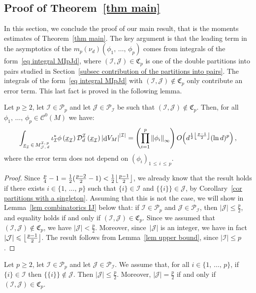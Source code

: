 \documentclass[AHL,Unicode,longabstracts,published]{cedram}
\DeclareMathOperator{\dmesure}{d}
\DeclarePairedDelimiter{\floor}{\lfloor}{\rfloor}
\newcommand{\D}{\mathcal{D}}
\newcommand{\I}{\mathcal{I}}
\newcommand{\J}{\mathcal{J}}
\newcommand{\clC}{\mathcal{C}}
\newcommand{\frkC}{\mathfrak{C}}
\newcommand{\pa}{\mathcal{P}\!}
\newcommand{\norm}[1]{\left\lvert #1 \right\rvert}
\newcommand{\Norm}[1]{\left\lVert #1 \right\rVert}
\newcommand{\rmes}[1]{\norm{\dmesure\! V_{#1}}}
\renewcommand{\geq}{\geqslant}
\renewcommand{\leq}{\leqslant}
\begin{document}

\subsection{Proof of Theorem~\ref{thm main}}\label{subsec proof of the main theorem}

In this section, we conclude the proof of our main result, that is the moments estimates of Theorem~\ref{thm main}. The key argument is that the leading term in the asymptotics of the $m_p(\nu_d)(\phi_1,\,\dots,\,\phi_p)$ comes from integrals of the form~\eqref{eq integral MIpJd}, where $(\I,\J) \in \frkC_p$ is one of the double partitions into pairs studied in Section~\ref{subsec contribution of the partitions into pairs}. The integrals of the form~\eqref{eq integral MIpJd} with $(\I,\J) \notin \frkC_p$ only contribute an error term. This last fact is proved in the following lemma.

\begin{lemm}\label{lem order of the error terms}
Let $p \geq 2$, let $\I \in \pa_p$ and let $\J \in \pa_\I$ be such that $(\I,\J) \notin \frkC_p$. Then, for all $\phi_1,\,\dots,\,\phi_p \in \clC^0(M)$ we have:
\[
\int_{\underline{x}_\I\,\in\,M^{\I,\,p}_{\J,\,d}} \iota_\I^*\phi\left(\underline{x}_\I\right) \D^\I_d\left(\underline{x}_\I\right) \rmes{M}^{\norm{\I}} = \left(\prod_{i=1}^p \Norm{\phi_i}_\infty \right)O\!\left(d^{\frac{1}{2}\floor*{\frac{p-1}{2}}}(\ln d)^p\right),
\]
where the error term does not depend on $(\phi_i)_{1\,\leq\,i \,\leq\,p}$.
\end{lemm}

\begin{proof}
Since $\tfrac{p}{4}-1 = \tfrac{1}{2}(\tfrac{p-2}{2} -1) < \frac{1}{2} \floor*{\frac{p-1}{2}}$, we already know that the result holds if there exists $i \in \{1,\,\dots,\,p\}$ such that $\{i\} \in \I$ and $\{\{i\}\} \in \J$, by Corollary~\ref{cor partitions with a singleton}. Assuming that this is not the case, we will show in Lemma~\ref{lem combinatorics IJ} below that: if $\I \in \pa_p$ and $\J \in \pa_\I$, then $|\J| \leq \tfrac{p}{2}$, and equality holds if and only if $(\I,\J) \in \frkC_p$. Since we assumed that $(\I,\J) \notin \frkC_p$, we have $|\J| < \tfrac{p}{2}$. Moreover, since~$|\J|$ is an integer, we have in fact $|\J| \leq \floor*{\frac{p-1}{2}}$. The result follows from Lemma~\ref{lem upper bound}, since $|\I| \leq p$.
\end{proof}

\begin{lemm}\label{lem combinatorics IJ}
Let $p \geq 2$, let $\I \in \pa_p$ and let $\J \in \pa_\I$. We assume that, for all $i \in \{1,\,\dots,\,p\}$, if $\{i\} \in \I$ then $\{\{i\}\} \notin \J$. Then $|\J| \leq \tfrac{p}{2}$. Moreover, $|\J| = \frac{p}{2}$ if and only if $(\I,\J) \in \frkC_p$.
\end{lemm}
\end{document}
